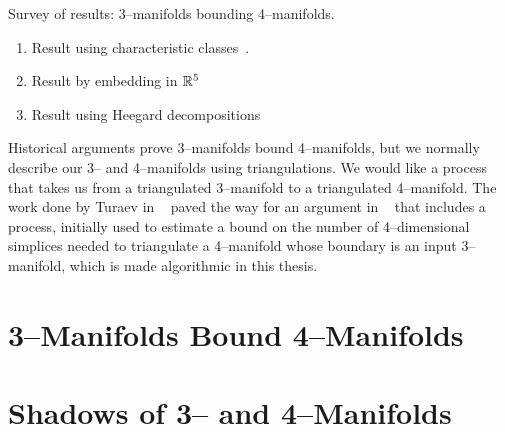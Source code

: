 \label{cha:background}

Survey of results: 3--manifolds bounding 4--manifolds.

\begin{enumerate}
  \item Result using characteristic classes~\cite{MilnStas}.
  \item Result by embedding in $\mathbb{R}^5$~\cite{Hirsch61}~\cite{Rokhlin65}~\cite{Wall65}
  \item Result using Heegard decompositions~\cite{Rourke85}
\end{enumerate}

Historical arguments prove 3--manifolds bound 4--manifolds, but we normally describe our 3-- and 4--manifolds using triangulations.
We would like a process that takes us from a triangulated 3--manifold to a triangulated 4--manifold.
The work done by Turaev in ~\cite{Turaev91} paved the way for an argument in ~\cite{CostThur08} that includes a process, initially used to estimate a bound on the number of 4--dimensional simplices needed to triangulate a 4--manifold whose boundary is an input 3--manifold, which is made algorithmic in this thesis.

\section{3--Manifolds Bound 4--Manifolds}


\section{Shadows of 3-- and 4--Manifolds}


%
